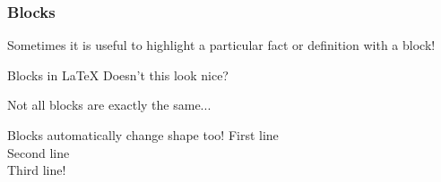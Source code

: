 \documentclass[pslatex , slidestop, compress, table]{beamer}
\begin{document}
\begin{frame}
\frametitle{Blocks}
Sometimes it is useful to highlight a particular fact or definition with a block!
\begin{block}{Blocks in \LaTeX}
	Doesn't this look nice?
\end{block}

Not all blocks are exactly the same...

\begin{block}{Blocks automatically change shape too!}
First line \\
Second line \\
Third line!
\end{block}
\end{frame}
\end{document}
